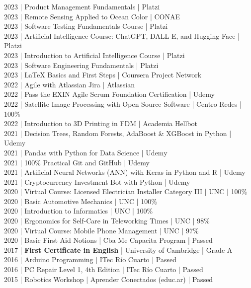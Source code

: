{2023 | Product Management Fundamentals | Platzi \\
2023 | Remote Sensing Applied to Ocean Color | CONAE \\
2023 | Software Testing Fundamentals Course | Platzi \\
2023 | Artificial Intelligence Course: ChatGPT, DALL-E, and Hugging Face | Platzi \\
2023 | Introduction to Artificial Intelligence Course | Platzi \\
2023 | Software Engineering Fundamentals | Platzi \\
2023 | LaTeX Basics and First Steps | Coursera Project Network \\
2022 | Agile with Atlassian Jira | Atlassian \\
2022 | Pass the EXIN Agile Scrum Foundation Certification | Udemy \\
2022 | Satellite Image Processing with Open Source Software | Centro Redes | 100\% \\
2022 | Introduction to 3D Printing in FDM | Academia Hellbot \\
2021 | Decision Trees, Random Forests, AdaBoost \& XGBoost in Python | Udemy \\
2021 | Pandas with Python for Data Science | Udemy \\
2021 | 100\% Practical Git and GitHub | Udemy \\
2021 | Artificial Neural Networks (ANN) with Keras in Python and R | Udemy \\
2021 | Cryptocurrency Investment Bot with Python | Udemy \\
2020 | Virtual Course: Licensed Electrician Installer Category III | UNC | 100\% \\
2020 | Basic Automotive Mechanics | UNC | 100\% \\
2020 | Introduction to Informatics | UNC | 100\% \\
2020 | Ergonomics for Self-Care in Teleworking Times | UNC | 98\% \\
2020 | Virtual Course: Mobile Phone Management | UNC | 97\% \\
2020 | Basic First Aid Notions | Cba Me Capacita Program | Passed \\
2017 | \textbf{First Certificate in English} | University of Cambridge | Grade A \\
2016 | Arduino Programming | ITec Río Cuarto | Passed \\
2016 | PC Repair Level 1, 4th Edition | ITec Río Cuarto | Passed \\
2015 | Robotics Workshop | Aprender Conectados (educ.ar) | Passed \\
}

\vspace{\spacesection}